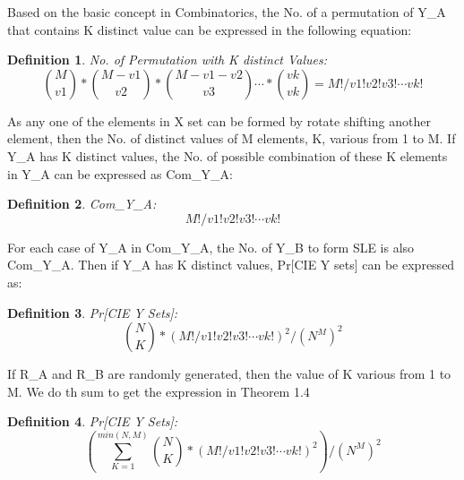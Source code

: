 \documentclass{article}
\newtheorem{defination}{Definition}[section]
\begin{document}
Based on the basic concept in Combinatorics, the No. of a permutation of Y\_A that contains K distinct value can be expressed in the following equation:
\begin{defination}
No. of Permutation with K distinct Values:
\begin{displaymath}
\binom{M}{v1} * \binom{M-v1}{v2} * \binom{M-v1-v2}{v3} \cdots * \binom{vk}{vk} = M!/v1!v2!v3! \cdots vk!
\end{displaymath}
\end{defination}
As any one of the elements in X set can be formed by rotate shifting another element, then the No. of distinct values of M elements, K, various from 1 to M. If Y\_A has K distinct values, the No. of possible combination of these K elements in Y\_A can be expressed as Com\_Y\_A:
\begin{defination}
Com\_Y\_A:
\begin{displaymath}
M!/v1!v2!v3! \cdots vk!
\end{displaymath} 
\end{defination} 

For each case of Y\_A in Com\_Y\_A, the No. of Y\_B to form SLE is also Com\_Y\_A. Then if Y\_A has K distinct values, Pr[CIE Y sets] can be expressed as:
\begin{defination}
Pr[CIE Y Sets]:
\begin{displaymath}
 \binom{N}{K} * (M!/v1!v2!v3! \cdots vk!) ^ 2 /(N^M)^2
\end{displaymath}
\end{defination}
If R\_A and R\_B are randomly generated, then the value of K various from 1 to M. We do th sum to get the expression in Theorem 1.4
\begin{defination}
Pr[CIE Y Sets]:
\begin{displaymath}
(\sum_{K=1}^{min(N,M)} \binom{N}{K} * (M!/v1!v2!v3! \cdots vk!) ^ 2 )/(N^M)^2
\end{displaymath}
\end{defination}
\end{document}
